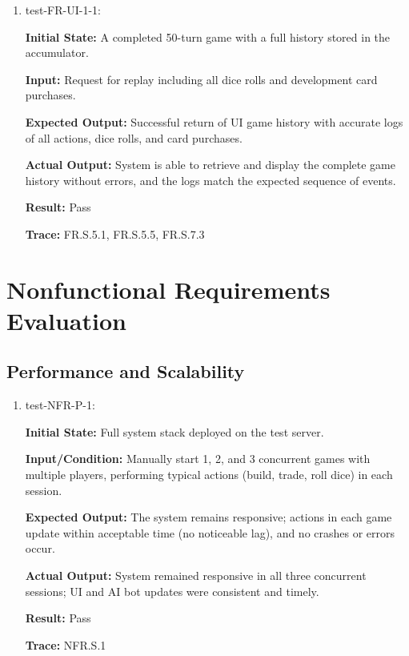 \documentclass[12pt, titlepage]{article}
\begin{document}
\begin{enumerate}



\item test-FR-UI-1-1:

\textbf{Initial State:} A completed 50-turn game with a full history stored in the accumulator.

\textbf{Input:} Request for replay including all dice rolls and development card purchases.

\textbf{Expected Output:} Successful return of UI game history with accurate logs of all actions, dice rolls, and card purchases.

\textbf{Actual Output:} System is able to retrieve and display the complete game history without errors, and the logs match the expected sequence of events.

\textbf{Result:} Pass

\textbf{Trace:} FR.S.5.1, FR.S.5.5, FR.S.7.3

\end{enumerate}

\section{Nonfunctional Requirements Evaluation}

\subsection{Performance and Scalability}

\begin{enumerate}
\item test-NFR-P-1:

\textbf{Initial State:} Full system stack deployed on the test server.

\textbf{Input/Condition:} Manually start 1, 2, and 3 concurrent games with multiple players, performing typical actions (build, trade, roll dice) in each session.

\textbf{Expected Output:} The system remains responsive; actions in each game update within acceptable time (no noticeable lag), and no crashes or errors occur.

\textbf{Actual Output:} System remained responsive in all three concurrent sessions; UI and AI bot updates were consistent and timely.

\textbf{Result:} Pass

\textbf{Trace:} NFR.S.1
\end{enumerate}
\end{document}
